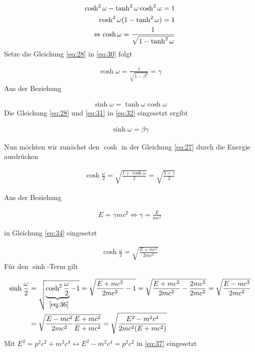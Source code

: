 \begin{align}
  \label{eq:30}
  \cosh^2\omega - \tanh^2\omega\cosh^2\omega = 1 \notag\\
  \cosh^2\omega(1- \tanh^2\omega) = 1\notag\\
\Leftrightarrow \cosh\omega = \frac{1}{\sqrt{1-\tanh^2\omega}}
\end{align}
Setze die Gleichung \eqref{eq:28} in \eqref{eq:30} folgt

\begin{align}
  \label{eq:31}
   \boxed{\cosh\omega = \frac{1}{\sqrt{1-\beta^2}} = \gamma }
\end{align}
Aus der Beziehung

\begin{align}
  \label{eq:32}
  \sinh\omega = \tanh\omega\cosh\omega
\end{align}
Die Gleichung \eqref{eq:28} und \eqref{eq:31} in \eqref{eq:32} eingesetzt ergibt

\begin{align}
  \label{eq:33}
  \boxed{\sinh\omega = \beta\gamma}
\end{align}

Nun möchten wir zunächst den \(\cosh\) in der Gleichung \eqref{eq:27} durch die Energie ausdrücken

\begin{align}
  \label{eq:34}
  \cosh\frac{\omega}{2} = \sqrt{\frac{1+\cosh\omega}{2}} = \sqrt{\frac{1+\gamma}{2}} 
\end{align}

Aus der Beziehung

\begin{align}
  \label{eq:35}
  E=\gamma mc^2 \Leftrightarrow \gamma = \frac{E}{mc^2}
\end{align}

in Gleichung \eqref{eq:34} eingesetzt

\begin{align}
  \label{eq:36}
   \cosh\frac{\omega}{2} = \sqrt{\frac{E + mc^2}{2mc^2}} 
\end{align}
Für den \(\sinh\)-Term gilt

\begin{align}
  \label{eq:37}
  \sinh\frac{\omega}{2} &=  \sqrt{\underbr{ \cosh^2\frac{\omega}{2}}_{~\eqref{eq:36}} - 1} =  \sqrt{\frac{E + mc^2}{2mc^2}  -1} =   \sqrt{\frac{E + mc^2}{2mc^2}  -\frac{2mc^2}{2mc^2}} =  \sqrt{\frac{E - mc^2}{2mc^2} } \notag \\
&=  \sqrt{\frac{E - mc^2}{2mc^2} \frac{E+mc^2}{E+mc^2}} =  \sqrt{\frac{E^2 - m^2c^4}{2mc^2(E+mc^2)} }
\end{align}
Mit \(E^2=p^2c^2+m^2c^4 \leftrightarrow E^2-m^2c^4 = p^2c^2\) in \eqref{eq:37} eingesetzt

